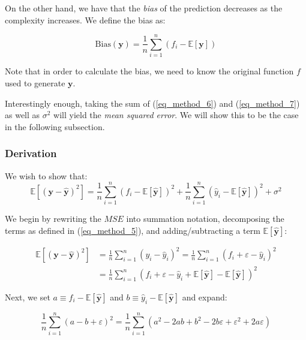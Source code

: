 \documentclass[a4paper,10pt,english]{article}
\begin{document}
On the other hand, we have that the \textit{bias} of the prediction decreases as the complexity increases.  We define the bias as:

\begin{equation}
\label{eq_method_7}
\text{Bias}(\mathbf{y}) = \frac{1}{n} \sum_{i=1}^{n} (f_i - \mathbb{E}[\mathbf{y}] )
\end{equation}

Note that in order to calculate the bias, we need to know the original function $f$ used to generate $\mathbf{y}$.

Interestingly enough, taking the sum of (\ref{eq_method_6}) and (\ref{eq_method_7}) as well as $\sigma^2$ will yield the \textit{mean squared error}.  We will show this to be the case in the following subsection.

\subsubsection{Derivation}

We wish to show that:
\begin{equation}
\label{eq_method_8}
\mathbb{E}\left[(\mathbf{y}-\hat{\mathbf{y}})^{2}\right]
=\frac{1}{n} \sum_{i=1}^{n}(f_{i}-\mathbb{E}[\hat{\mathbf{y}}])^{2}+\frac{1}{n} \sum_{i=1}^{n}(\hat{y}_{i}-\mathbb{E}[\hat{\mathbf{y}}])^{2}+\sigma^{2}
\end{equation}

We begin by rewriting the $MSE$ into summation notation, decomposing the terms as defined in (\ref{eq_method_5}), and adding/subtracting a term $\mathbb{E}[\hat{\mathbf{y}}]$:

\begin{align*}
\mathbb{E}\left[(\mathbf{y}-\hat{\mathbf{y}})^{2}\right] &= \frac{1}{n} \sum_{i=1}^{n} ( y_i - \hat{y}_i )^2 = \frac{1}{n} \sum_{i=1}^{n} ( f_i + \varepsilon - \hat{y}_i )^2 \\
&= \frac{1}{n} \sum_{i=1}^{n} ( f_i + \varepsilon - \hat{y}_i  + \mathbb{E}[\hat{\mathbf{y}}] - \mathbb{E}[\hat{\mathbf{y}}] )^2
\end{align*}

Next, we set $a \equiv f_i - \mathbb{E}[\hat{\mathbf{y}}] $ and $b \equiv \hat{y}_i - \mathbb{E}[\hat{\mathbf{y}}]$ and expand:

\begin{equation*}
\frac{1}{n} \sum_{i=1}^{n} (a - b + \varepsilon )^2
= \frac{1}{n} \sum_{i=1}^{n} ( a^2 - 2ab + b^2 - 2b\varepsilon + \varepsilon^2 + 2a\varepsilon )
\end{equation*}
\end{document}
